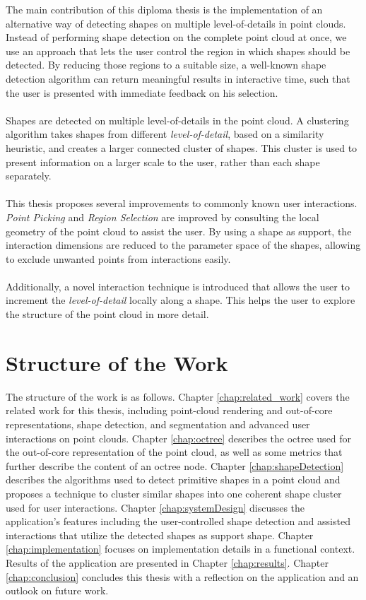 The main contribution of this diploma thesis is the implementation of an alternative way of detecting shapes on multiple level-of-details in point clouds. Instead of performing shape detection on the complete point cloud at once, we use an approach that lets the user control the region in which shapes should be detected. By reducing those regions to a suitable size, a well-known shape detection algorithm can return meaningful results in interactive time, such that the user is presented with immediate feedback on his selection. 
\\
\\
Shapes are detected on multiple level-of-details in the point cloud. A clustering algorithm takes shapes from different \textit{level-of-detail}, based on a similarity heuristic, and creates a larger connected cluster of shapes. This cluster is used to present information on a larger scale to the user, rather than each shape separately. 
\\
\\ 
This thesis proposes several improvements to commonly known user interactions. \textit{Point Picking} and \textit{Region Selection} are improved by consulting the local geometry of the point cloud to assist the user. By using a shape as support, the interaction dimensions are reduced to the parameter space of the shapes, allowing to exclude unwanted points from interactions easily. 
\\
\\
Additionally,  a novel interaction technique is introduced that allows the user to increment the \textit{level-of-detail} locally along a shape. This helps the user to explore the structure of the point cloud in more detail. 


\section{Structure of the Work}

The structure of the work is as follows. Chapter \ref{chap:related_work} covers the related work for this thesis, including point-cloud rendering and out-of-core representations, shape detection, and segmentation and advanced user interactions on point clouds. Chapter \ref{chap:octree} describes the octree used for the out-of-core representation of the point cloud, as well as some metrics that further describe the content of an octree node. Chapter \ref{chap:shapeDetection} describes the algorithms used to detect primitive shapes in a point cloud and proposes a technique to cluster similar shapes into one coherent shape cluster used for user interactions. Chapter \ref{chap:systemDesign} discusses the application's features including the user-controlled shape detection and assisted interactions that utilize the detected shapes as support shape. Chapter \ref{chap:implementation} focuses on implementation details in a functional context. Results of the application are presented in Chapter \ref{chap:results}. Chapter \ref{chap:conclusion} concludes this thesis with a reflection on the application and an outlook on future work. 
